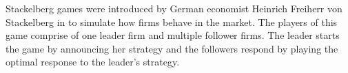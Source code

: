 
Stackelberg games were introduced by German economist Heinrich Freiherr von Stackelberg in \cite{S34} to simulate how firms behave in the market. The players of this game comprise of one leader firm and multiple follower firms. The leader starts the game by announcing her strategy and the followers respond by playing the optimal response to the leader's strategy.


